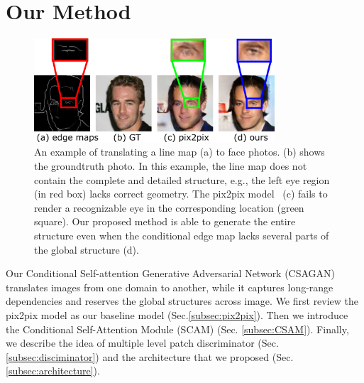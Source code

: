 \section{Our Method}
\label{sec:method}

% 
\begin{figure}
	\includegraphics[width=0.8\textwidth]{figures/example}
	\caption{An example of translating a line map (a) to face photos. (b) shows the groundtruth photo. In this example, the line map does not contain the complete and detailed structure, e.g., the left eye region (in red box) lacks correct geometry. The pix2pix model~\cite{pix2pix} (c) fails to render a recognizable eye in the corresponding location (green square). Our proposed method is able to generate the entire structure even when the conditional edge map lacks several parts of the global structure (d).}
	\label{fig:example}
\end{figure}
%
Our Conditional Self-attention Generative Adversarial Network (CSAGAN) translates images from one domain to another, while it captures long-range dependencies and reserves
the global structures across image. We first review the pix2pix model as our baseline model (Sec.\ref{subsec:pix2pix}). 
Then we introduce the Conditional Self-Attention Module (SCAM) (Sec. \ref{subsec:CSAM}). Finally, we describe the idea of multiple level patch discriminator (Sec.\ref{subsec:disciminator}) and the architecture that we proposed (Sec. \ref{subsec:architecture}).



